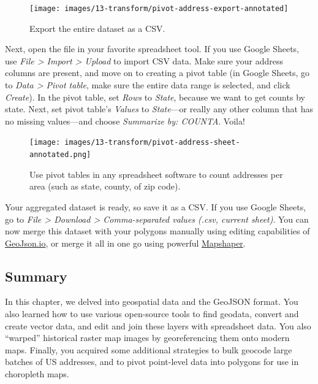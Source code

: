 \documentclass[
  english,
]{book}
\begin{document}
\begin{figure}
\texttt{[image: images/13-transform/pivot-address-export-annotated]} \caption{Export the entire dataset as a CSV.}\label{fig:pivot-address-export}
\end{figure}

Next, open the file in your favorite spreadsheet tool. If you use Google Sheets,
use \emph{File \textgreater{} Import \textgreater{} Upload} to import CSV data. Make sure your address columns are present,
and move on to creating a pivot table (in Google Sheets, go to \emph{Data \textgreater{} Pivot table}, make sure the entire data range
is selected, and click \emph{Create}). In the pivot table, set \emph{Rows} to \emph{State}, because
we want to get counts by state. Next, set pivot table's \emph{Values} to \emph{State}---or really any other
column that has no missing values---and choose \emph{Summarize by: COUNTA}. Voila!



\begin{figure}
\centering
\texttt{[image: images/13-transform/pivot-address-sheet-annotated.png]}
\caption{\label{fig:pivot-address-sheet}Use pivot tables in any spreadsheet software to count addresses per area (such as state, county, of zip code).}
\end{figure}

Your aggregated dataset is ready, so save it as a CSV. If you use Google Sheets,
go to \emph{File \textgreater{} Download \textgreater{} Comma-separated values (.csv, current sheet)}.
You can now merge this dataset with your polygons manually using editing capabilities of
\href{geojsonio.html}{GeoJson.io}, or merge it all in one go using powerful \href{mapshaper.html}{Mapshaper}.

\hypertarget{summary13}{%
\subsection*{Summary}\label{summary13}}

In this chapter, we delved into geospatial data and the GeoJSON format. You also learned how to use various open-source tools to find geodata, convert and create vector data, and edit and join these layers with spreadsheet data. You also ``warped'' historical raster map images by georeferencing them onto modern maps. Finally, you acquired some additional strategies to bulk geocode large batches of US addresses, and to pivot point-level data into polygons for use in choropleth maps.
\end{document}
